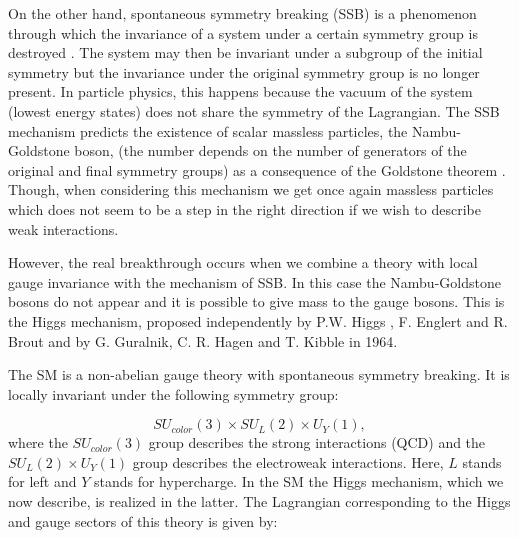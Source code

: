 On the other hand, spontaneous symmetry breaking (SSB) is a phenomenon through which the invariance of a system under a certain symmetry group is destroyed \cite{SSB}. The system may then be invariant under a subgroup of the initial symmetry but the invariance under the original symmetry group is no longer present. In particle physics, this happens because the vacuum of the system (lowest energy states) does not share the symmetry of the Lagrangian. The SSB mechanism predicts the existence of scalar massless particles, the Nambu-Goldstone boson, (the number depends on the number of generators of the original and final symmetry groups) as a consequence of the Goldstone theorem \cite{Goldstone}. Though, when considering this mechanism we get once again massless particles which does not seem to be a step in the right direction if we wish to describe weak interactions. 

However, the real breakthrough occurs when we combine a theory with local gauge invariance with the mechanism of SSB. In this case the Nambu-Goldstone bosons do not appear and it is possible to give mass to the gauge bosons. This is the Higgs mechanism, proposed independently by P.W. Higgs \cite{Higgs}, F. Englert and R. Brout \cite{EnglertBrout} and by G. Guralnik, C. R. Hagen and T. Kibble \cite{Guralnik} in 1964. 

The SM is a non-abelian gauge theory with spontaneous symmetry breaking. It is locally invariant under the following symmetry group:

\begin{equation}
SU_{color}(3)\times SU_L(2)\times U_Y(1), 
\end{equation} 
where the $SU_{color}(3)$ group describes the strong interactions (QCD) and the $SU_L(2)\times U_Y(1)$ group describes the electroweak interactions. Here, $L$ stands for left and $Y$ stands for hypercharge. In the SM the Higgs mechanism, which we now describe, is realized in the latter. The Lagrangian corresponding to the Higgs and gauge sectors of this theory is given by:

